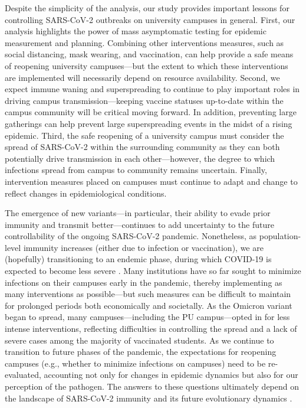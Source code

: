 \documentclass[12pt]{article}
\begin{document}
Despite the simplicity of the analysis, our study provides important lessons for controlling SARS-CoV-2 outbreaks on university campuses in general.
First, our analysis highlights the power of mass asymptomatic testing for epidemic measurement and planning.
Combining other interventions measures, such as social distancing, mask wearing, and vaccination, can help provide a safe means of reopening university campuses---but the extent to which these interventions are implemented will necessarily depend on resource availability.
Second, we expect immune waning and superspreading to continue to play important roles in driving campus transmission---keeping vaccine statuses up-to-date within the campus community will be critical moving forward.
In addition, preventing large gatherings can help prevent large superspreading events in the midst of a rising epidemic.
Third, the safe reopening of a university campus must consider the spread of SARS-CoV-2 within the surrounding community as they can both potentially drive transmission in each other---however, the degree to which infections spread from campus to community remains uncertain.
Finally, intervention measures placed on campuses must continue to adapt and change to reflect changes in epidemiological conditions.

The emergence of new variants---in particular, their ability to evade prior immunity and transmit better---continues to add uncertainty to the future controllability of the ongoing SARS-CoV-2 pandemic.
Nonetheless, as population-level immunity increases (either due to infection or vaccination), we are (hopefully) transitioning to an endemic phase, during which COVID-19 is expected to become less severe \citep{lavine2021immunological}.
Many institutions have so far sought to minimize infections on their campuses early in the pandemic, thereby implementing as many interventions as possible---but such measures can be difficult to maintain for prolonged periods both economically and societally.
As the Omicron variant began to spread, many campuses---including the PU campus---opted in for less intense interventions, reflecting difficulties in controlling the spread and a lack of severe cases among the majority of vaccinated students.
As we continue to transition to future phases of the pandemic, the expectations for reopening campuses (e.g., whether to minimize infections on campuses) need to be re-evaluated, accounting not only for changes in epidemic dynamics but also for our perception of the pathogen.
The answers to these questions ultimately depend on the landscape of SARS-CoV-2 immunity and its future evolutionary dynamics \citep{saad2020immune,baker2021limits}.
\end{document}
